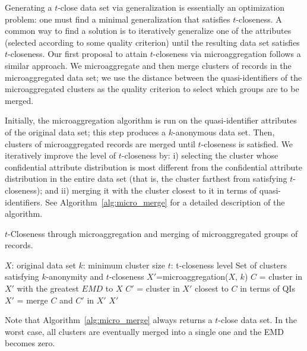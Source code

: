 \documentclass[10pt,journal,compsoc]{IEEEtran}
\theoremstyle{definition}
\theoremstyle{plain}
\begin{document}
Generating a $t$-close data set via generalization is essentially
an optimization problem: one must find a minimal generalization 
that satisfies $t$-closeness.
A common way to find a solution is to iteratively
generalize one of the attributes (selected according to some quality
criterion) until the resulting data set satisfies $t$-closeness. Our 
first proposal to attain $t$-closeness via microaggregation follows
a similar approach. We microaggregate and then 
merge clusters of records in the microaggregated data set;
we use the distance between the quasi-identifiers of the
microaggregated clusters as the quality criterion
to select which groups are to be merged.  

Initially, the microaggregation algorithm is run on the quasi-identifier
attributes of the original data set; this step produces a $k$-anonymous
data set. Then, clusters of microaggregated records are merged until
$t$-closeness is satisfied. We iteratively improve the level of $t$-closeness
by: i) selecting the cluster whose confidential attribute 
distribution is most different from the confidential
attribute distribution in the entire data set (that is,
the cluster farthest from 
satisfying $t$-closeness); and ii) merging it with the cluster 
closest to it in terms of quasi-identifiers. 
See Algorithm~\ref{alg:micro_merge}
for a detailed description of the algorithm.

\begin{algorithm}
	\protect\caption{\label{alg:micro_merge}$t$-Closeness through microaggregation and
		merging of microaggregated groups of records.}
		
	\begin{algorithmic}[0]
		 $X$: original data set
		\State \hspace{1.11cm}$k$: minimum cluster size
		\State \hspace{1.11cm}$t$: t-closeness level
		 Set of clusters satisfying $k$-anonymity and $t$-closeness
		\vspace{0.3cm}
		\State $X'$=microaggregation($X$, $k$)\;
			\State$C$ = cluster in $X'$ with the greatest $EMD$ to $X$
			\State$C'$ = cluster in $X'$ closest to $C$ in terms of QIs
			\State$X'$ = merge $C$ and $C'$ in $X'$
		\EndWhile\label{f}
		 $X'$\;
	\end{algorithmic}
	

\end{algorithm}

Note that Algorithm~\ref{alg:micro_merge} always returns a $t$-close
data set. In the worst case, all clusters are eventually 
merged into a single one and the EMD becomes zero.
\end{document}

